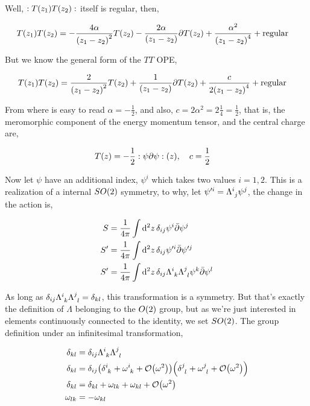 Well, $:T\qty(z_1)T\qty(z_2):$ itself is regular, then,

\begin{align*}
    { T\qty(z_1)T\qty(z_2)}&=-\frac{4\alpha}{\qty(z_1-z_2)^2}T\qty(z_2)-\frac{2\alpha}{\qty(z_1-z_2)}\partial T\qty(z_2)+\frac{\alpha^2}{\qty(z_1-z_2)^4}+\textnormal{regular}
\end{align*}

But we know the general form of the $TT$ OPE,

\begin{align*}
    { T\qty(z_1)T\qty(z_2)}&=\frac{2}{\qty(z_1-z_2)^2}T\qty(z_2)+\frac{1}{\qty(z_1-z_2)}\partial T\qty(z_2)+\frac{c}{2\qty(z_1-z_2)^4}+\textnormal{regular}
\end{align*}

From where is easy to read $\alpha=-\frac12$, and also, $c=2\alpha^2=2\frac14=\frac12$, that is, the meromorphic component of the 
energy momentum tensor, and the central charge are,

\begin{align*}
    T\qty(z)&=-\frac12\cnord{\psi\partial\psi}\qty(z),\ \ \ c=\frac12
\end{align*}

\probitem{}
\label{3c}
Now let $\psi$ have an additional index, $\psi^i$ which takes two values $i=1,2$. This is a realization of a internal $SO\qty(2)$ symmetry, to why, 
let $\psi'^i=\tensor{\Lambda}{^i_j}\psi^j$, the change in the action is,

\begin{align*}
    S&=\frac{1}{4\pi}\int\dd[2]{z}\delta_{ij}\psi^i\bar\partial\psi^j\\
    S'&=\frac{1}{4\pi}\int\dd[2]{z}\delta_{ij}\psi'^i\bar\partial\psi'^j\\
    S'&=\frac{1}{4\pi}\int\dd[2]{z}\delta_{ij}\tensor{\Lambda}{^i_k}\tensor{\Lambda}{^j_l}\psi^k\bar\partial\psi^l
\end{align*}

As long as $\delta_{ij}\tensor{\Lambda}{^i_k}\tensor{\Lambda}{^j_l}=\delta_{kl}$, this transformation is a symmetry. But that's exactly the 
definition of $\Lambda$ belonging to the $O\qty(2)$ group, but as we're just interested in elements continuously connected to the identity, 
we set $SO\qty(2)$. The group definition under an infinitesimal transformation,

\begin{align*}
    \delta_{kl}&=\delta_{ij}\tensor{\Lambda}{^i_k}\tensor{\Lambda}{^j_l}\\
    \delta_{kl}&=\delta_{ij}\qty(\tensor{\delta}{^i_k}+\tensor{\omega}{^i_k}+\mathcal O\qty(\omega^2))\qty(\tensor{\delta}{^j_l}+\tensor{\omega}{^j_l}+\mathcal O\qty(\omega^2))\\
    \delta_{kl}&=\delta_{kl}+\omega_{lk}+\omega_{kl}+\mathcal O\qty(\omega^2)\\
    \omega_{lk}&=-\omega_{kl}
\end{align*}

